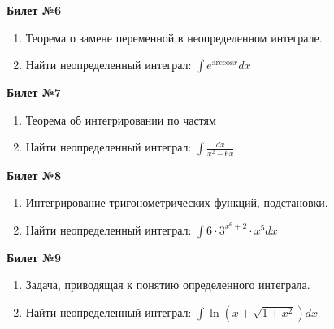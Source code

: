 \documentclass[a4paper, 12pt]{article}
\begin{document}
\begin{center}
	\textbf{Билет №6}
\end{center}
\begin{enumerate}
	\item Теорема о замене переменной в неопределенном интеграле.
	\item Найти неопределенный интеграл: $\displaystyle \int{e^{\text{arccos}x} dx}$
\end{enumerate}

\begin{center}
	\textbf{Билет №7}
\end{center}
\begin{enumerate}
	\item Теорема об интегрировании по частям 
	\item Найти неопределенный интеграл: $\displaystyle \int{\frac{dx}{x^2 - 6x}}$
\end{enumerate}

\begin{center}
	\textbf{Билет №8}
\end{center}
\begin{enumerate}
	\item Интегрирование тригонометрических функций, подстановки.
	\item Найти неопределенный интеграл: $\displaystyle \int{6 \cdot 3^{x^6 + 2} \cdot x^5 dx}$
\end{enumerate}

\begin{center}
	\textbf{Билет №9}
\end{center}
\begin{enumerate}
	\item Задача, приводящая к понятию определенного интеграла.
	\item Найти неопределенный интеграл: $\displaystyle \int{\ln (x + \sqrt{1 + x^2}) dx}$
\end{enumerate}
\end{document}
